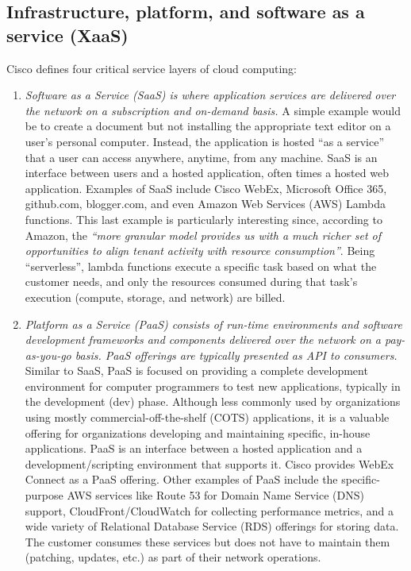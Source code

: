 \subsection{Infrastructure, platform, and software as a service (XaaS)}

Cisco defines four critical service layers of cloud computing:

\begin{enumerate}
  \item \textit{Software as a Service (SaaS) is where application services are
  delivered over the network on a subscription and on-demand basis.} A simple
  example would be to create a document but not installing the appropriate
  text editor on a user’s personal computer. Instead, the application is
  hosted ``as a service'' that a user can access anywhere, anytime, from any
  machine. SaaS is an interface between users and a hosted application, often
  times a hosted web application. Examples of SaaS include Cisco WebEx,
  Microsoft Office 365, github.com, blogger.com, and even Amazon Web Services
  (AWS) Lambda functions. This last example is particularly interesting since,
  according to Amazon, the \textit{``more granular model provides us with a
  much richer set of opportunities to align tenant activity with resource
  consumption''}. Being ``serverless'', lambda functions execute a specific task
  based on what the customer needs, and only the resources consumed during
  that task's execution (compute, storage, and network) are billed.

  \item \textit{Platform as a Service (PaaS) consists of run-time environments and
  software development frameworks and components delivered over the network on
  a pay-as-you-go basis. PaaS offerings are typically presented as API to
  consumers.} Similar to SaaS, PaaS is focused on providing a complete
  development environment for computer programmers to test new applications,
  typically in the development (dev) phase. Although less commonly used by
  organizations using mostly commercial-off-the-shelf (COTS) applications, it
  is a valuable offering for organizations developing and maintaining
  specific, in-house applications. PaaS is an interface between a hosted
  application and a development/scripting environment that supports it. Cisco
  provides WebEx Connect as a PaaS offering. Other examples of PaaS include
  the specific-purpose AWS services like Route 53 for Domain Name Service
  (DNS) support, CloudFront/CloudWatch for collecting performance metrics, and
  a wide variety of Relational Database Service (RDS) offerings for storing
  data. The customer consumes these services but does not have to maintain
  them (patching, updates, etc.) as part of their network operations.


\end{enumerate}
